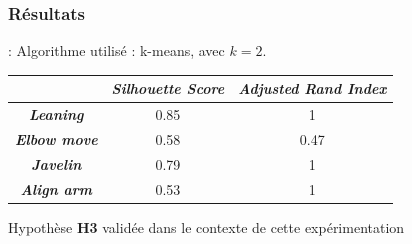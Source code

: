 \documentclass[svgnames]{beamer}
\begin{document}
	\subsubsection{Résultats}
	\begin{frame}{\subsecname : \MakeLowercase{\subsubsecname}}
	Algorithme utilisé : k-means, avec $k=2$.
	
	\begin{table}[h]
		\centering
		\begin{tabular}{c|c|c}
			& \textit{Silhouette Score} &	 \textit{Adjusted Rand Index}\\\hline
			\textbf{\textit{Leaning}} & \cellcolor{green!25}0.85 & \cellcolor{green!25}1\\
			\textbf{\textit{Elbow move}} & \cellcolor{blue!25}0.58 & \cellcolor{yellow!25}0.47\\
			\textbf{\textit{Javelin}} & \cellcolor{green!25}0.79 & \cellcolor{green!25}1\\
			\textbf{\textit{Align arm}} & \cellcolor{blue!25}0.53 & \cellcolor{green!25}1\\
		\end{tabular}
	\end{table}
		
		Hypothèse \textbf{H3} validée dans le contexte de cette expérimentation
		
	\end{frame}
	
\end{document}
